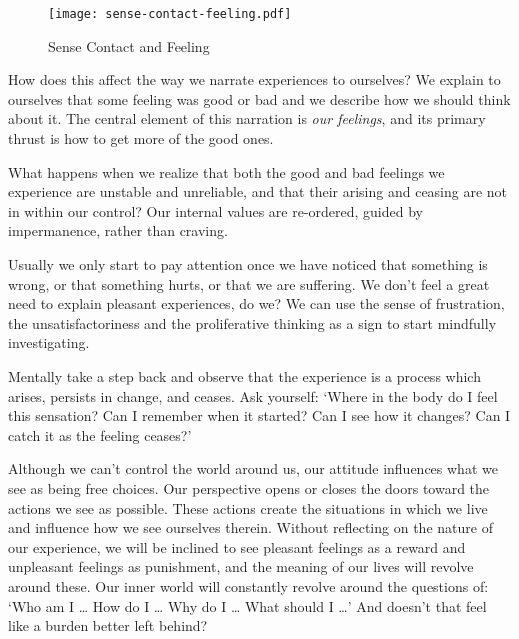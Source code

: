 \clearpage

\begin{figure}[h]
\caption{Sense Contact and Feeling}\label{fig-sense-contact-feeling}
\bigskip\centering
\texttt{[image: sense-contact-feeling.pdf]}
\end{figure}

\clearpage


How does this affect the way we narrate experiences to ourselves? We
explain to ourselves that some feeling was good or bad and we describe
how we should think about it. The central element of this narration is
\emph{our feelings}, and its primary thrust is how to get more of the
good ones.

What happens when we realize that both the good and bad feelings we
experience are unstable and unreliable, and that their arising and
ceasing are not in within our control? Our internal values are
re-ordered, guided by impermanence, rather than craving.


Usually we only start to pay attention once we have noticed that
something is wrong, or that something hurts, or that we are suffering.
We don't feel a great need to explain pleasant experiences, do we? We
can use the sense of frustration, the unsatisfactoriness and the
proliferative thinking as a sign to start mindfully investigating.

Mentally take a step back and observe that the experience is a process
which arises, persists in change, and ceases. Ask yourself: `Where in
the body do I feel this sensation? Can I remember when it started? Can I
see how it changes? Can I catch it as the feeling ceases?'

Although we can't control the world around us, our attitude influences
what we see as being free choices. Our perspective opens or closes the
doors toward the actions we see as possible. These actions create the
situations in which we live and influence how we see ourselves therein.
Without reflecting on the nature of our experience, we will be inclined
to see pleasant feelings as a reward and unpleasant feelings as
punishment, and the meaning of our lives will revolve around these. Our
inner world will constantly revolve around the questions of: `Who am I
\ldots{} How do I \ldots{} Why do I \ldots{} What should I \ldots{}' And
doesn't that feel like a burden better left behind?

